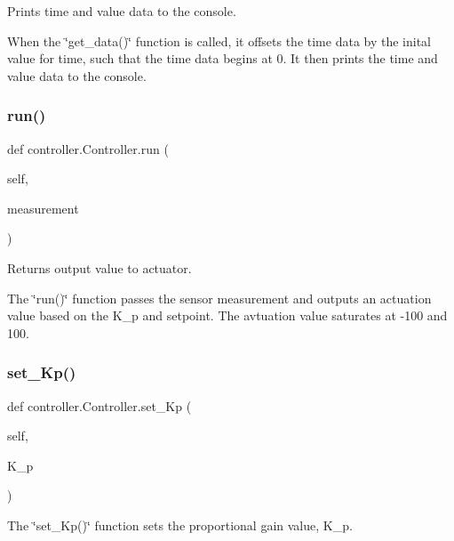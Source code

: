 Prints time and value data to the console. 

When the \char`\"{}get\+\_\+data()\char`\"{} function is called, it offsets the time data by the inital value for time, such that the time data begins at 0. It then prints the time and value data to the console. \mbox{\label{classcontroller_1_1_controller_a960dfc22275e951cf58fb9902460cc83}} 
\subsubsection{\texorpdfstring{run()}{run()}}
{\footnotesize\ttfamily def controller.\+Controller.\+run (\begin{DoxyParamCaption}\item[{}]{self,  }\item[{}]{measurement }\end{DoxyParamCaption})}



Returns output value to actuator. 

The \char`\"{}run()\char`\"{} function passes the sensor measurement and outputs an actuation value based on the K\+\_\+p and setpoint. The avtuation value saturates at -\/100 and 100. \mbox{\label{classcontroller_1_1_controller_a467766c3be5989bb97d078288b5aee8d}} 
\subsubsection{\texorpdfstring{set\+\_\+\+Kp()}{set\_Kp()}}
{\footnotesize\ttfamily def controller.\+Controller.\+set\+\_\+\+Kp (\begin{DoxyParamCaption}\item[{}]{self,  }\item[{}]{K\+\_\+p }\end{DoxyParamCaption})}



The \char`\"{}set\+\_\+\+Kp()\char`\"{} function sets the proportional gain value, K\+\_\+p. 

\mbox{\label{classcontroller_1_1_controller_a8a682a3fddd60e136faf9f138639f1d9}} 
